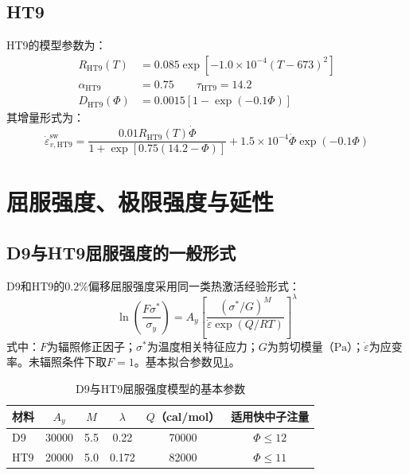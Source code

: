 \subsection{HT9}

HT9的模型参数为：
\begin{equation}
	\label{eq:appendix_ht9_swelling_parameters}
	\begin{aligned}
		R_{\mathrm{HT9}}(T)
		&=0.085\exp[-1.0\times10^{-4}(T-673)^2]\\
		\alpha_{\mathrm{HT9}}&=0.75
		\qquad
		\tau_{\mathrm{HT9}}=14.2\\
		D_{\mathrm{HT9}}(\varPhi)
		&=0.0015[1-\exp(-0.1\varPhi)]
	\end{aligned}
\end{equation}
其增量形式为：
\begin{equation}
	\dot\varepsilon_{v,\mathrm{HT9}}^{\mathrm{sw}}
	=\frac{0.01R_{\mathrm{HT9}}(T)\dot\varPhi}
	{1+\exp[0.75(14.2-\varPhi)]}
	+1.5\times10^{-4}\dot\varPhi\exp(-0.1\varPhi)
	\label{eq:appendix_ht9_swelling_rate}
\end{equation}

\section{屈服强度、极限强度与延性}
\label{app:cladding_strength_models}

\subsection{D9与HT9屈服强度的一般形式}

D9和HT9的$0.2\%$偏移屈服强度采用同一类热激活经验形式\cite{hofmanMetallicFuelsHandbook2019}：
\begin{equation}
	\ln\!\left(\frac{F\sigma^*}{\sigma_y}\right)
	=A_y\left[
	\frac{(\sigma^*/G)^M}
	{\dot\varepsilon\exp(Q/RT)}
	\right]^\lambda
	\label{eq:appendix_cladding_yield_strength_general}
\end{equation}
\noindent 式中：$F$为辐照修正因子；$\sigma^*$为温度相关特征应力；$G$为剪切模量（$\mathrm{Pa}$）；$\dot\varepsilon$为应变率。未辐照条件下取$F=1$。基本拟合参数见\tablename\ref{tab:appendix_cladding_yield_parameters}。

\begin{table}[htbp]
	\centering
	\caption{D9与HT9屈服强度模型的基本参数}
	\label{tab:appendix_cladding_yield_parameters}
	\begin{tabular*}{\textwidth}{
			@{\extracolsep{\fill}}
			lccccc
			@{}
		}
		\toprule
		材料 & $A_y$ & $M$ & $\lambda$ & $Q$（cal/mol） & 适用快中子注量 \\
		\midrule
		D9  & 30000 & 5.5 & 0.22  & 70000 & $\varPhi\leq12$ \\
		HT9 & 20000 & 5.0 & 0.172 & 82000 & $\varPhi\leq11$ \\
		\bottomrule
	\end{tabular*}
\end{table}


